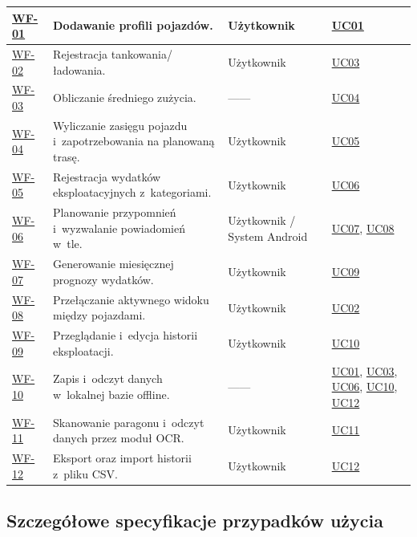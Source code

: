 \begin{longtable}{|>{\centering\arraybackslash}m{1.5cm}|m{\dimexpr\linewidth - 6.3cm - 8\tabcolsep - 5\arrayrulewidth\relax}|>{\centering\arraybackslash}m{2.6cm}|>{\centering\arraybackslash}m{2.2cm}|}
    \hyperlink{wf:WF-01}{WF-01} & Dodawanie profili pojazdów. & Użytkownik & \hyperlink{uc:UC01}{UC01} \\
    \hline
    \hyperlink{wf:WF-02}{WF-02} & Rejestracja tankowania/ładowania. & Użytkownik & \hyperlink{uc:UC03}{UC03} \\
    \hline
    \hyperlink{wf:WF-03}{WF-03} & Obliczanie średniego zużycia. & ------ & \hyperlink{uc:UC04}{UC04} \\
    \hline
    \hyperlink{wf:WF-04}{WF-04} & Wyliczanie zasięgu pojazdu i~zapotrzebowania na planowaną trasę. & Użytkownik & \hyperlink{uc:UC05}{UC05} \\
    \hline
    \hyperlink{wf:WF-05}{WF-05} & Rejestracja wydatków eksploatacyjnych z~kategoriami. & Użytkownik & \hyperlink{uc:UC06}{UC06} \\
    \hline
    \hyperlink{wf:WF-06}{WF-06} & Planowanie przypomnień i~wyzwalanie powiadomień w~tle. & Użytkownik / System Android & \hyperlink{uc:UC07}{UC07}, \hyperlink{uc:UC08}{UC08} \\
    \hline
    \hyperlink{wf:WF-07}{WF-07} & Generowanie miesięcznej prognozy wydatków. & Użytkownik & \hyperlink{uc:UC09}{UC09} \\
    \hline
    \hyperlink{wf:WF-08}{WF-08} & Przełączanie aktywnego widoku między pojazdami. & Użytkownik & \hyperlink{uc:UC02}{UC02} \\
    \hline
    \hyperlink{wf:WF-09}{WF-09} & Przeglądanie i~edycja historii eksploatacji. & Użytkownik & \hyperlink{uc:UC10}{UC10} \\
    \hline
    \hyperlink{wf:WF-10}{WF-10} & Zapis i~odczyt danych w~lokalnej bazie offline. & ------ & \hyperlink{uc:UC01}{UC01}, \hyperlink{uc:UC03}{UC03}, \hyperlink{uc:UC06}{UC06}, \hyperlink{uc:UC10}{UC10}, \hyperlink{uc:UC12}{UC12} \\
    \hline
    \hyperlink{wf:WF-11}{WF-11} & Skanowanie paragonu i~odczyt danych przez moduł OCR. & Użytkownik & \hyperlink{uc:UC11}{UC11} \\
    \hline
    \hyperlink{wf:WF-12}{WF-12} & Eksport oraz import historii z~pliku CSV. & Użytkownik & \hyperlink{uc:UC12}{UC12} \\
    \hline
\end{longtable}
\endgroup

\subsection{Szczegółowe specyfikacje przypadków użycia}
\label{subsec:scenariusze_przypadkow_uzycia}

